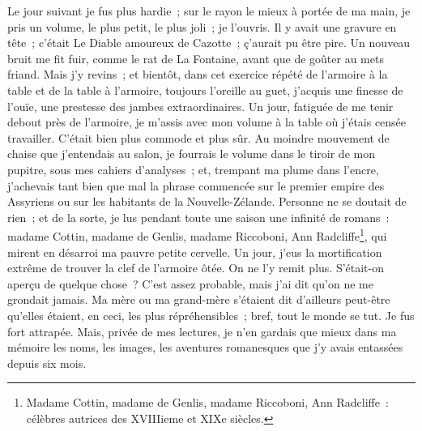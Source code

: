{Le jour suivant je fus plus hardie~; sur le rayon le mieux à portée de ma main, je pris un volume, le plus petit, le plus joli~; je l'ouvris. Il y avait une gravure en tête~; c'était Le Diable amoureux de Cazotte~; ç'aurait pu être pire. Un nouveau bruit me fit fuir, comme le rat de La Fontaine, avant que de goûter au mets friand. Mais j'y revins~; et bientôt, dans cet exercice répété de l'armoire à la table et de la table à l'armoire, toujours l'oreille au guet, j'acquis une finesse de l'ouïe, une prestesse des jambes extraordinaires. Un jour, fatiguée de me tenir debout près de l'armoire, je m'assis avec mon volume à la table où j'étais censée travailler. C'était bien plus commode et plus sûr. Au moindre mouvement de chaise que j'entendais au salon, je fourrais le volume dans le tiroir de mon pupitre, sous mes cahiers d'analyses~; et, trempant ma plume dans l'encre, j'achevais tant bien que mal la phrase commencée sur le premier empire des Assyriens ou sur les habitants de la Nouvelle-Zélande. Personne ne se doutait de rien~; et de la sorte, je lus pendant toute une saison une infinité de romans~: madame Cottin, madame de Genlis, madame Riccoboni, Ann Radcliffe\footnote{Madame Cottin, madame de Genlis, madame Riccoboni, Ann Radcliffe~: célèbres autrices des XVIII{ieme} et XIX{e} siècles.}, qui mirent en désarroi ma pauvre petite cervelle. Un jour, j'eus la mortification extrême de trouver la clef de l'armoire ôtée. On ne l'y remit plus. S'était-on aperçu de quelque chose~? C'est assez probable, mais j'ai dit qu'on ne me grondait jamais. Ma mère ou ma grand-mère s'étaient dit d'ailleurs peut-être qu'elles étaient, en ceci, les plus répréhensibles~; bref, tout le monde se tut. Je fus fort attrapée. Mais, privée de mes lectures, je n'en gardais que mieux dans ma mémoire les noms, les images, les aventures romanesques que j'y avais entassées depuis six mois.
	}



